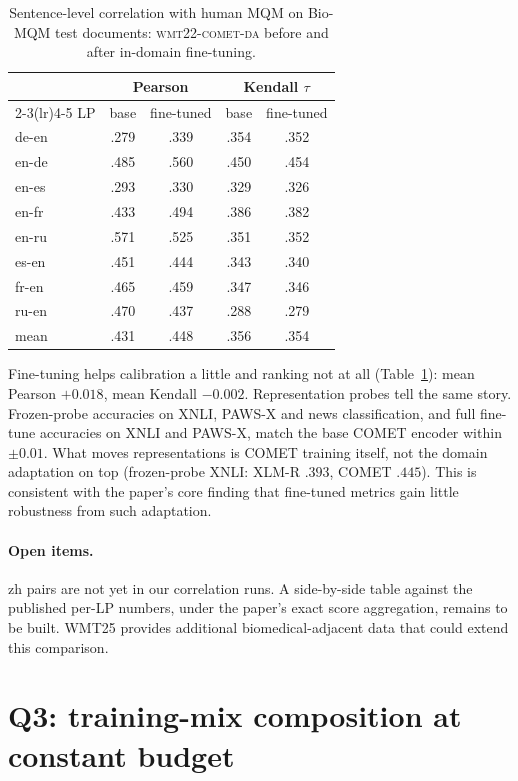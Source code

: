 \documentclass[11pt]{article}
\newcommand{\cometda}{\textsc{wmt22-comet-da}}
\begin{document}
\begin{table}[t]
\centering\small
\begin{tabular}{l cc cc}
\toprule
& \multicolumn{2}{c}{Pearson} & \multicolumn{2}{c}{Kendall $\tau$}\\
\cmidrule(lr){2-3}\cmidrule(lr){4-5}
LP & base & fine-tuned & base & fine-tuned\\
\midrule
de-en & .279 & .339 & .354 & .352\\
en-de & .485 & .560 & .450 & .454\\
en-es & .293 & .330 & .329 & .326\\
en-fr & .433 & .494 & .386 & .382\\
en-ru & .571 & .525 & .351 & .352\\
es-en & .451 & .444 & .343 & .340\\
fr-en & .465 & .459 & .347 & .346\\
ru-en & .470 & .437 & .288 & .279\\
\midrule
mean  & .431 & .448 & .356 & .354\\
\bottomrule
\end{tabular}
\caption{Sentence-level correlation with human MQM on Bio-MQM test documents: \cometda{} before and after in-domain fine-tuning.}
\label{tab:bio}
\end{table}

Fine-tuning helps calibration a little and ranking not at all (Table~\ref{tab:bio}): mean Pearson $+0.018$, mean Kendall $-0.002$.
Representation probes tell the same story.
Frozen-probe accuracies on XNLI, PAWS-X and news classification, and full fine-tune accuracies on XNLI and PAWS-X, match the base COMET encoder within $\pm 0.01$.
What moves representations is COMET training itself, not the domain adaptation on top (frozen-probe XNLI: XLM-R $.393$, COMET $.445$).
This is consistent with the paper's core finding that fine-tuned metrics gain little robustness from such adaptation.

\paragraph{Open items.}
zh pairs are not yet in our correlation runs.
A side-by-side table against the published per-LP numbers, under the paper's exact score aggregation, remains to be built.
WMT25 provides additional biomedical-adjacent data that could extend this comparison.

\section{Q3: training-mix composition at constant budget}
\label{sec:mix}
\end{document}
